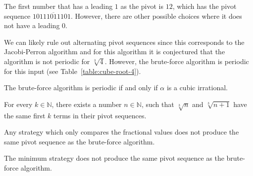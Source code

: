 \begin{remark}
  The first number that has a leading $1$ as the pivot is $12$,
  which has the pivot sequence $1\overline{0111011101}$.
  However, there are other possible choices where it does not have a leading $0$.
\end{remark}

We can likely rule out alternating pivot sequences since this corresponds to
the Jacobi-Perron algorithm and for this algorithm it is conjectured
\cite{Karpenkov2024} that the algorithm is not periodic for $\sqrt[3]{4}$.
However, the brute-force algorithm is periodic for this input (see Table~\ref{table:cube-root-4}).

\begin{conjecture}
  The brute-force algorithm is periodic if and only if $α$ is a cubic irrational.
\end{conjecture}

\begin{lemma}
  \label{lem:consecutive-same}
  For every $k ∈ ℕ$, there exists a number $n ∈ ℕ$,
  such that $\sqrt[3]{n}$ and $\sqrt[3]{n + 1}$ have the same first $k$ terms in
  their pivot sequences.
\end{lemma}

\begin{corollary}
  Any strategy which only compares the fractional values does not produce the
  same pivot sequence as the brute-force algorithm.
\end{corollary}

\begin{corollary}
  The minimum strategy does not produce the same pivot sequence as the
  brute-force algorithm.
\end{corollary}

\iffalse
\begin{theorem}
  There exists no algorithm which given $x ∈ ℝ^d$ can determine the same
  strategy as the brute-force search using only $f(d)$ comparison, addition
  and subtraction operations, for some computable function $f \colon ℕ → ℕ$.
\end{theorem}

\begin{proof}
  Idea: A constant-number of additions and subtraction only compare the integer
  parts of each $x_i$ when the values are chosen close enough to an integer.
  Because the trees are the same for the first level, the output for both
  inputs must be the same.

  We choose $x₁ = f(d)$ and $x₂ = \sqrt{f(d) + 1}$ where $n^3 > f(d)$.
  In particular, $x₁$ is an integer and $x₂$ is between $x₁$ and the next integer.
  Suppose the algorithm compares $a₁ x₁$ with $a₂ x₂$ for $|a₁|, |a₂| ≤ f(d)$.
  \[
    a₂ x₂
    = a₂ \sqrt{(f(d))^2 + i + 1}
    ≤ a₂ \left( f(d) + \frac{1}{3 f(d)} \right)
    = a₂ · f(d) + \frac{a₂}{3 f(d)} \right)
  \]
  Furthermore, $a₂ x₂ ≥ a₂ · f(d)$.
  Therefore, the integer part of $a₂ x₂$ is equal to $a₂ x₁$,
  even if $a₂ = f(d)$.
  Hence, any algorithm can only compare the integer parts of $x₁$ and $x₂$.
\end{proof}
\fi

